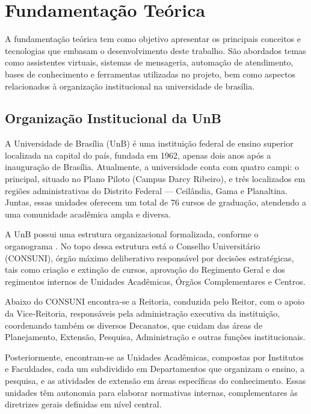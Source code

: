 \chapter[Fundamentação Teórica]{Fundamentação Teórica}

A fundamentação teórica tem como objetivo apresentar os principais conceitos e tecnologias que embasam o desenvolvimento deste trabalho. São abordados temas como assistentes virtuais, sistemas de mensageria, automação de atendimento, bases de conhecimento e ferramentas utilizadas no projeto, bem como aspectos relacionados à organização institucional na universidade de brasília.

\section{Organização Institucional da UnB}

A Universidade de Brasília (UnB) é uma instituição federal de ensino superior localizada na capital do país, fundada em 1962, apenas dois anos após a inauguração de Brasília. Atualmente, a universidade conta com quatro campi: o principal, situado no Plano Piloto (Campus Darcy Ribeiro), e três localizados em regiões administrativas do Distrito Federal — Ceilândia, Gama e Planaltina. Juntas, essas unidades oferecem um total de 76 cursos de graduação, atendendo a uma comunidade acadêmica ampla e diversa. 

A UnB possui uma estrutura organizacional formalizada, conforme o organograma \cite{organogramaUnB2017}. No topo dessa estrutura está o Conselho Universitário (CONSUNI), órgão máximo deliberativo responsável por decisões estratégicas, tais como criação e extinção de cursos, aprovação do Regimento Geral e dos regimentos internos de Unidades Acadêmicas, Órgãos Complementares e Centros.

Abaixo do CONSUNI encontra-se a Reitoria, conduzida pelo Reitor, com o apoio da Vice‑Reitoria, responsáveis pela administração executiva da instituição, coordenando também os diversos Decanatos, que cuidam das áreas de Planejamento, Extensão, Pesquisa, Administração e outras funções institucionais.

Posteriormente, encontram-se as Unidades Acadêmicas, compostas por Institutos e Faculdades, cada um subdividido em Departamentos que organizam o ensino, a pesquisa, e as atividades de extensão em áreas específicas do conhecimento. Essas unidades têm autonomia para elaborar normativas internas, complementares às diretrizes gerais definidas em nível central.

